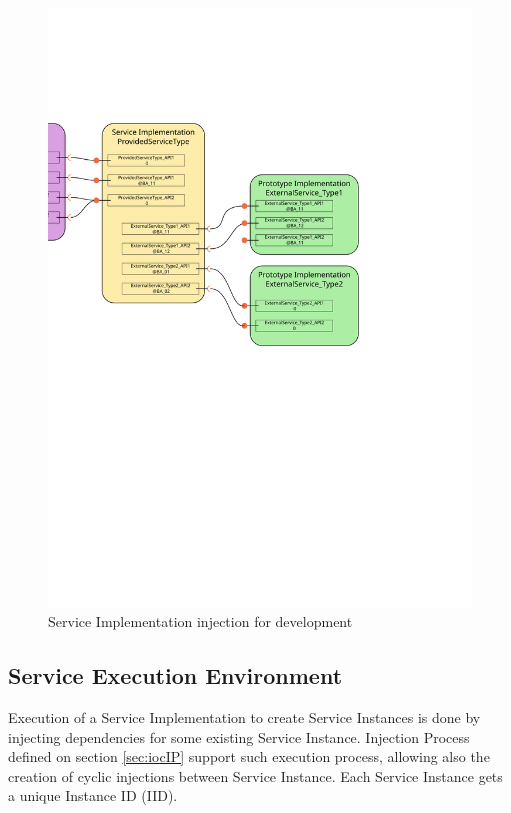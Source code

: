 \begin{figure}
 \centering
 \includegraphics[width=1\textwidth]{serviceImplementation}
 \caption{Service Implementation injection for development}
 \label{fig:serviceImplementation}
\end{figure}

\newpage
\subsection{Service Execution Environment}
\label{sec:intSEE}

Execution of a Service Implementation to create Service Instances is done by injecting dependencies for some existing Service Instance. Injection Process defined on section \ref{sec:iocIP} support such execution process, allowing also the creation of cyclic injections between Service Instance. Each Service Instance gets a unique Instance ID (IID).

